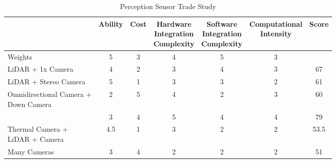 \documentclass{article}
\begin{document}
		\begin{table}[H]
		\begin{adjustwidth}{0in}{0in}
		\setlength{\dashlinedash}{.4pt}
		\setlength\tabcolsep{4pt}

		\centering
		\begin{tabular}{|l|c|c|c|c|c|c|}
		\hline
		                                     & Ability & Cost & \makecell{Hardware \\ Integration \\ Complexity} & \makecell{Software \\ Integration \\ Complexity} & \makecell{Computational \\ Intensity} & Score \\ \hline
		Weights                              & 5       & 3    & 4                               & 5                               & 3                       &       \\ \hline
		LiDAR + 1x Camera                    & 4       & 2    & 3                               & 4                               & 3                       & 67    \\ \hdashline
		LiDAR + Stereo Camera                & 5       & 1    & 3                               & 3                               & 2                       & 61    \\ \hdashline
		\makecell[l]{Omnidirectional Camera + \\ Down Camera} & 2       & 5    & 4                               & 2                               & 3                       & 60    \\ \hdashline
		\multicolumn{1}{|l|}{\cellcolor{highlight}Stereo Camera Only} & \multicolumn{1}{c|}{\cellcolor{highlight}3}       & \multicolumn{1}{c|}{\cellcolor{highlight}4}    & \multicolumn{1}{c|}{\cellcolor{highlight}5}                               & \multicolumn{1}{c|}{\cellcolor{highlight}4}                               & \multicolumn{1}{c|}{\cellcolor{highlight}4}                       & \multicolumn{1}{c|}{\cellcolor{highlight}79}    \\ \hdashline
		\makecell[l]{Thermal Camera + \\ LiDAR + Camera}      & 4.5     & 1    & 3                               & 2                               & 2                       & 53.5  \\ \hdashline
		Many Cameras                         & 3       & 4    & 2                               & 2                               & 2                       & 51    \\ \hline
		\end{tabular}
		\caption{Perception Sensor Trade Study}
		\label{my-label}
		\end{adjustwidth}
		\end{table}
\end{document}
